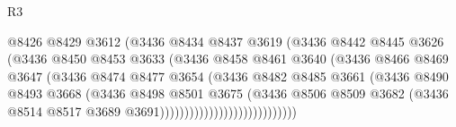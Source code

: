 \begin{lexlean}{R3}
\begin{coremodule}
                                      @8426
                                      @8429
                                      @3612
                                      (@3436
                                        @8434
                                        @8437
                                        @3619
                                        (@3436
                                          @8442
                                          @8445
                                          @3626
                                          (@3436
                                            @8450
                                            @8453
                                            @3633
                                            (@3436
                                              @8458
                                              @8461
                                              @3640
                                              (@3436
                                                @8466
                                                @8469
                                                @3647
                                                (@3436
                                                  @8474
                                                  @8477
                                                  @3654
                                                  (@3436
                                                    @8482
                                                    @8485
                                                    @3661
                                                    (@3436
                                                      @8490
                                                      @8493
                                                      @3668
                                                      (@3436
                                                        @8498
                                                        @8501
                                                        @3675
                                                        (@3436
                                                          @8506
                                                          @8509
                                                          @3682
                                                          (@3436
                                                            @8514
                                                            @8517
                                                            @3689
                                                            @3691))))))))))))))))))))))))))))

\end{coremodule}
\end{lexlean}
